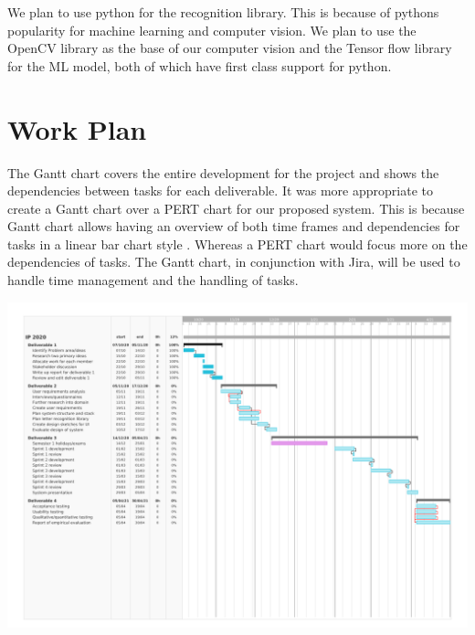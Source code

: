 \documentclass[10pt]{article}
\begin{document}
We plan to use python for the recognition library. This is because of pythons popularity for 
machine learning and computer vision. We plan to use the OpenCV library as the base of our 
computer vision and the Tensor flow library for the ML model, both of which have first class 
support for python.

\section{Work Plan}

The Gantt chart covers the entire development for the project and shows the dependencies between 
tasks for each deliverable. It was more appropriate to create a Gantt chart over a PERT chart for 
our proposed system. This is because Gantt chart allows having an overview of both time frames and 
dependencies for tasks in a linear bar chart style . Whereas a PERT chart would focus more on the 
dependencies of tasks. The Gantt chart, in conjunction with Jira, will be used to handle time 
management and the handling of tasks.

\includegraphics[width=\textwidth]{IpGantt.png}

\newpage



\end{document}
